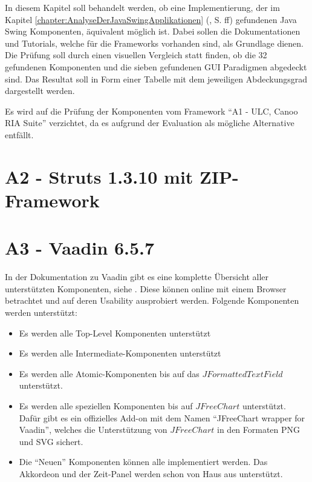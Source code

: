 In diesem Kapitel soll behandelt werden, ob eine Implementierung, der im Kapitel 
\ref{chapter:AnalyseDerJavaSwingApplikationen}
(, S.
\pageref{chapter:AnalyseDerJavaSwingApplikationen}ff) gefundenen Java Swing
Komponenten, äquivalent möglich ist. Dabei sollen die Dokumentationen und
Tutorials, welche für die Frameworks vorhanden sind, als Grundlage dienen. Die
Prüfung soll durch einen visuellen Vergleich statt finden, ob die 32 gefundenen
Komponenten und die sieben gefundenen GUI Paradigmen abgedeckt sind. Das
Resultat soll in Form einer Tabelle mit dem jeweiligen Abdeckungsgrad
dargestellt werden.

Es wird auf die Prüfung der Komponenten vom Framework ``A1 - ULC, Canoo RIA
Suite'' verzichtet, da es aufgrund der Evaluation als mögliche Alternative
entfällt.

\section{A2 - Struts 1.3.10 mit ZIP-Framework}

\section{A3 - Vaadin 6.5.7}

In der Dokumentation zu Vaadin gibt es eine komplette Übersicht aller
unterstützten Komponenten, siehe \cite{VaadinKomponenten}. Diese können online
mit einem Browser betrachtet und auf deren Usability ausprobiert werden.
Folgende Komponenten werden unterstützt:

\begin{itemize}
  \item Es werden alle Top-Level Komponenten unterstützt
  \item Es werden alle Intermediate-Komponenten unterstützt
  \item Es werden alle Atomic-Komponenten bis auf das
  \(JFormattedTextField\) unterstützt.
  \item Es werden alle speziellen Komponenten bis auf
  \(JFreeChart\) unterstützt. Dafür gibt es ein offizielles
  Add-on mit dem Namen ``JFreeChart wrapper for Vaadin'', welches die
  Unterstützung von \(JFreeChart\) in den Formaten \ac{PNG} und \ac{SVG}
  sichert.
  \item Die ``Neuen'' Komponenten können alle implementiert werden. Das
  Akkordeon und der Zeit-Panel werden schon von Haus aus unterstützt.
\end{itemize}

